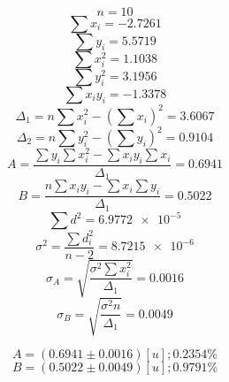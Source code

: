 \documentclass[letter,11pt]{article}
\begin{document}
\begin{equation*}
    n = 10
\end{equation*}
\begin{equation*}
    \sum x_i = -2.7261
\end{equation*}
\begin{equation*}
    \sum y_i = 5.5719
\end{equation*}
\begin{equation*}
    \sum x^2_i = 1.1038
\end{equation*}
\begin{equation*}
    \sum y^2_i = 3.1956
\end{equation*}
\begin{equation*}
    \sum x_i y_i = -1.3378
\end{equation*}
\begin{equation*}
    \Delta_1 = n \sum x^2_i - \left( \sum x_i \right)^2 = 3.6067
\end{equation*}
\begin{equation*}
    \Delta_2 = n \sum y^2_i - \left( \sum y_i \right)^2 = 0.9104
\end{equation*}
\begin{equation*}
    A = \frac{\sum y_i \sum x^2_i - \sum x_i y_i \sum x_i}{\Delta_1} = 0.6941
\end{equation*}
\begin{equation*}
    B = \frac{n \sum x_i y_i - \sum x_i \sum y_i}{\Delta_1} = 0.5022
\end{equation*}
\begin{equation*}
    \sum d^2 = \num{6.9772e-5}
\end{equation*}
\begin{equation*}
    \sigma^2 = \frac{\sum d^2_i}{n-2} = \num{8.7215e-6}
\end{equation*}
\begin{equation*}
    \sigma_A = \sqrt{\frac{\sigma^2 \sum x^2_i}{\Delta_1}} = 0.0016
\end{equation*}
\begin{equation*}
    \sigma_B = \sqrt{\frac{\sigma^2 n}{\Delta_1}} = 0.0049
\end{equation*}

\begin{equation*}
    A = (0.6941 \pm 0.0016) [u]; 0.2354 \%
\end{equation*}
\begin{equation*}
    B = (0.5022 \pm 0.0049) [u]; 0.9791 \%
\end{equation*}
\end{document}
